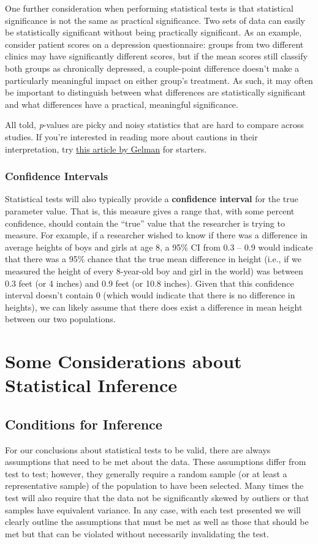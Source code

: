One further consideration when performing statistical tests is that statistical significance is not the same as practical significance. Two sets of data can easily be statistically significant without being practically significant. As an example, consider patient scores on a depression questionnaire: groups from two different clinics may have significantly different scores, but if the mean scores still classify both groups as chronically depressed, a couple-point difference doesn't make a particularly meaningful impact on either group's treatment. As such, it may often be important to distinguish between what differences are statistically significant and what differences have a practical, meaningful significance.

All told, \textit{p}-values are picky and noisy statistics that are hard to compare across studies. If you're interested in reading more about cautions in their interpretation, try \href{http://www.stat.columbia.edu/~gelman/research/published/pvalues3.pdf}{this article by Gelman} for starters.

\subsubsection{Confidence Intervals}
Statistical tests will also typically provide a \textbf{confidence interval}  for the true parameter value. That is, this measure gives a range that, with some percent confidence, should contain the ``true'' value that the researcher is trying to measure. For example, if a researcher wished to know if there was a difference in average heights of boys and girls at age 8, a 95\% CI from 0.3 -- 0.9 would indicate that there was a 95\% chance that the true mean difference in height (i.e., if we measured the height of every 8-year-old boy and girl in the world) was between 0.3 feet (or 4 inches) and 0.9 feet (or 10.8 inches). Given that this confidence interval doesn't contain 0 (which would indicate that there is no difference in heights), we can likely assume that there does exist a difference in mean height between our two populations.

\section{Some Considerations about Statistical Inference}

\subsection{Conditions for Inference}
For our conclusions about statistical tests to be valid, there are always assumptions that need to be met about the data. These assumptions differ from test to test; however, they generally require a random sample (or at least a representative sample) of the population to have been selected. Many times the test will also require that the data not be significantly skewed by outliers or that samples have equivalent variance. In any case, with each test presented we will clearly outline the assumptions that must be met as well as those that should be met but that can be violated without necessarily invalidating the test.

